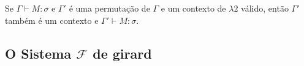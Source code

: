 \documentclass[../main.tex]{subfiles}
\begin{document}
\begin{lemma}
    Se $\Gamma \vdash M : \sigma$ e $\Gamma'$ é uma permutação de $\Gamma$ e um contexto de $\lambda2$ válido, então $\Gamma'$ também é um contexto e $\Gamma' \vdash M : \sigma$.
\end{lemma}

\subsection[O sistema F de Girard]{O Sistema $\mathcal{F}$ de girard}
\end{document}
